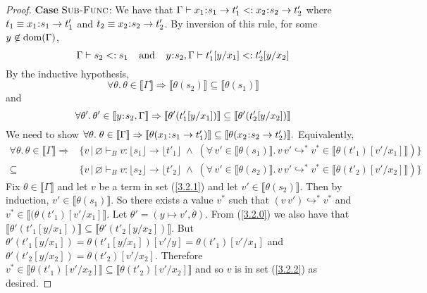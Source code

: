 \documentclass[11pt]{article}
\newcommand{\bind}{\hspace{0.05em}{:}\hspace{0.05em}} %
\newcommand{\lb}{\llbracket}         %
\newcommand{\rb}{\rrbracket}         %
\newcommand{\many}{\hookrightarrow^*}
\newcommand{\dom}[1]{{\rm dom}(#1)}
\begin{document}
\begin{proof}
{\bf Case} $\textsc{Sub-Func}$: We have that
$\Gamma \vdash x_1\bind s_1 \rightarrow t'_1 <: x_2\bind s_2 \rightarrow t'_2$ where $t_1 \equiv x_1\bind s_1 \rightarrow t'_1$ and $t_2 \equiv x_2\bind s_2 \rightarrow t'_2$. By inversion of this rule, for some $y\not\in\dom{\Gamma}$,
\[
\Gamma \vdash s_2 <: s_1 \;\;\;\;{\rm and}\;\;\;\;
y\bind s_2, \Gamma \vdash t'_1[y/x_1] <: t'_2[y/x_2]
\]
By the inductive hypothesis,
\[
\forall\theta.\, \theta \in \lb\Gamma\rb \Rightarrow
\lb\theta(s_2)\rb \subseteq\lb\theta(s_1)\rb 
\]
and
\begin{equation}\label{3.2.0}
\forall\theta'.\, \theta' \in \lb y\bind s_2,\Gamma\rb \Rightarrow
\lb\theta'(t'_1[y/x_1])\rb \subseteq\lb\theta'(t'_2[y/x_2])\rb 
\end{equation}
We need to show $\forall \theta.\; 
\theta \in \lb \Gamma \rb \Rightarrow 
\lb\theta(x_1\bind s_1\rightarrow t'_1)\rb \subseteq \lb\theta(x_2\bind s_2\rightarrow t'_2)\rb.$
Equivalently,
\begin{align} \label{3.2.1}
\forall\theta.\,\theta\in\lb\Gamma\rb \Rightarrow&
\{ v \,|\, \varnothing \vdash_B v:\lfloor s_1\rfloor \rightarrow \lfloor t'_1\rfloor \;\wedge\; 
  (\forall\, v' \in \lb \theta(s_1)\rb.\, v\,v' \many v^* \in\lb \theta(t'_1)[v'/x_1]\rb)\}\\
\subseteq &\{ v \,|\, \varnothing \vdash_B v:\lfloor s_2\rfloor \rightarrow \lfloor t'_2\rfloor \;\wedge\; 
  (\forall\, v' \in \lb \theta(s_2)\rb.\, v\,v' \many v^* \in\lb \theta(t'_2)[v'/x_2]\rb)\}\label{3.2.2} 
\end{align}
Fix $\theta \in \lb\Gamma\rb$ and let $v$ be a term in set (\ref{3.2.1}) and let $v' \in \lb \theta(s_2)\rb$. Then by induction, $v' \in \lb \theta(s_1)\rb$. So there exists a value $v^*$ such that $(v\, v') \many v^*$ and $v^* \in \lb(\theta(t'_1)[v'/x_1]\rb$. Let $\theta' = (y \mapsto v', \theta)$.  From (\ref{3.2.0}) we also have that 
$\lb\theta'(t'_1[y/x_1])\rb \subseteq \lb\theta'(t'_2[y/x_2])\rb$.
But $\theta'(t'_1[y/x_1]) = \theta(t'_1[y/x_1])[v'/y] = \theta(t'_1)[v'/x_1]$ and $\theta'(t'_2[y/x_2]) = \theta(t'_2)[v'/x_2]$.
Therefore  $v^* \in \lb \theta(t'_1)[v'/x_2]\rb \subseteq \lb \theta(t'_2)[v'/x_2]\rb$ and so $v$ is in set (\ref{3.2.2}) as desired.


\end{proof}
\end{document}
